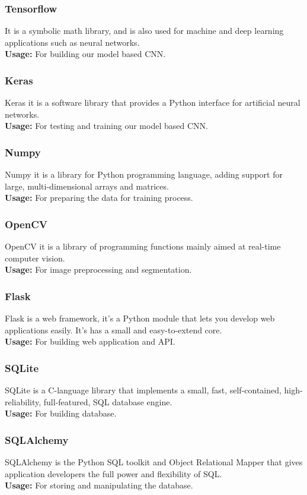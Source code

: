 \subsubsection{Tensorflow}
It is a symbolic math library, and is also used for machine and deep learning applications such as neural networks.
\\
\textbf{Usage:} For building our model based CNN.
\subsubsection{Keras}
Keras it is a software library that provides a Python interface for artificial neural networks.
\\
\textbf{Usage:} For testing and training our model based CNN.
\subsubsection{Numpy}
Numpy it is a library for Python programming language, adding support for large,
multi-dimensional arrays and matrices.
\\
\textbf{Usage:} For preparing the data for training process.
\subsubsection{OpenCV}
OpenCV it is a library of programming functions mainly aimed at real-time computer vision.
\\
\textbf{Usage:} For image preprocessing and segmentation.
\subsubsection{Flask}
Flask is a web framework, it’s a Python module that lets you develop web applications easily. It’s has a small and easy-to-extend core.
\\
\textbf{Usage:} For building web application and API.
\subsubsection{SQLite}
SQLite is a C-language library that implements a small, fast, self-contained, high-reliability, full-featured, SQL database engine.
\\
\textbf{Usage:} For building database.
\subsubsection{SQLAlchemy}
SQLAlchemy is the Python SQL toolkit and Object Relational Mapper that gives application developers the full power and flexibility of SQL.
\\
\textbf{Usage:} For storing and manipulating the database.
